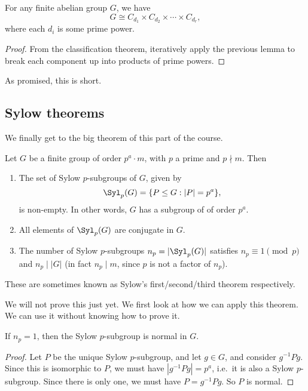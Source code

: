 \documentclass[a4paper]{article}
\begin{document}
\begin{cor}
  For any finite abelian group $G$, we have
  \[
    G \cong C_{d_1} \times C_{d_2} \times \cdots \times C_{d_r},
  \]
  where each $d_i$ is some prime power.
\end{cor}

\begin{proof}
  From the classification theorem, iteratively apply the previous lemma to break each component up into products of prime powers.
\end{proof}

As promised, this is short.

\subsection{Sylow theorems}
We finally get to the big theorem of this part of the course.
\begin{thm}
  Let $G$ be a finite group of order $p^a \cdot m$, with $p$ a prime and $p \nmid m$. Then
  \begin{enumerate}
    \item The set of Sylow $p$-subgroups of $G$, given by
      \[
        \Syl_p(G) = \{P \leq G: |P| = p^a\},
      \]
      is non-empty. In other words, $G$ has a subgroup of of order $p^a$.
    \item All elements of $\Syl_p(G)$ are conjugate in $G$.
    \item The number of Sylow $p$-subgroups $n_p = |\Syl_p(G)|$ satisfies $n_p \equiv 1 \pmod p$ and $n_p \mid |G|$ (in fact $n_p \mid m$, since $p$ is not a factor of $n_p$).
  \end{enumerate}
\end{thm}
These are sometimes known as Sylow's first/second/third theorem respectively.

We will not prove this just yet. We first look at how we can apply this theorem. We can use it without knowing how to prove it.

\begin{lemma}
  If $n_p = 1$, then the Sylow $p$-subgroup is normal in $G$.
\end{lemma}

\begin{proof}
  Let $P$ be the unique Sylow $p$-subgroup, and let $g \in G$, and consider $g^{-1}Pg$. Since this is isomorphic to $P$, we must have $|g^{-1} Pg| = p^a$, i.e.\ it is also a Sylow $p$-subgroup. Since there is only one, we must have $P = g^{-1}Pg$. So $P$ is normal.
\end{proof}
\end{document}
